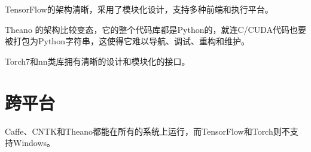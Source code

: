 \documentclass[a4paper,12pt]{ctexart}
\begin{document}
TensorFlow的架构清晰，采用了模块化设计，支持多种前端和执行平台。

Theano 的架构比较变态，它的整个代码库都是Python的，就连C/CUDA代码也要被打包为Python字符串，这使得它难以导航、调试、重构和维护。

Torch7和nn类库拥有清晰的设计和模块化的接口。

\section{跨平台}

Caffe、CNTK和Theano都能在所有的系统上运行，而TensorFlow和Torch则不支持Windows。

%


%
%

%
\end{document}
